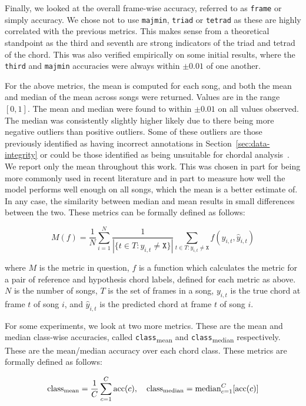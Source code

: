 Finally, we looked at the overall frame-wise accuracy, referred to as \texttt{frame} or simply accuracy. We chose not to use \texttt{majmin}, \texttt{triad} or \texttt{tetrad} as these are highly correlated with the previous metrics. This makes sense from a theoretical standpoint as the third and seventh are strong indicators of the triad and tetrad of the chord. This was also verified empirically on some initial results, where the \texttt{third} and \texttt{majmin} accuracies were always within $\pm 0.01$ of one another.

For the above metrics, the mean is computed for each song, and both the mean and median of the mean across songs were returned. Values are in the range $[0,1]$. The mean and median were found to within $\pm 0.01$ on all values observed. The median was consistently slightly higher likely due to there being more negative outliers than positive outliers. Some of these outliers are those previously identified as having incorrect annotations in Section~\ref{sec:data-integrity} or could be those identified as being unsuitable for chordal analysis~\citep{FourTimelyInsights}. We report only the mean throughout this work. This was chosen in part for being more commonly used in recent literature and in part to measure how well the model performs well enough on all songs, which the mean is a better estimate of. In any case, the similarity between median and mean results in small differences between the two. These metrics can be formally defined as follows:

\[ M(f) = \frac{1}{N} \sum_{i=1}^{N} \frac{1}{|\{t\in T : y_{i,t} \neq \texttt{X}\}|} \sum_{t\in T : y_{i,t} \neq \texttt{X}} f(y_{i,t}, \hat{y}_{i,t})\]

where $M$ is the metric in question, $f$ is a function which calculates the metric for a pair of reference and hypothesis chord labels, defined for each metric as above. $N$ is the number of songs, $T$ is the set of frames in a song, $y_{i,t}$ is the true chord at frame $t$ of song $i$, and $\hat{y}_{i,t}$ is the predicted chord at frame $t$ of song $i$.

For some experiments, we look at two more metrics. These are the mean and median class-wise accuracies, called \texttt{class}\textsubscript{mean} and \texttt{class}\textsubscript{median} respectively. These are the mean/median accuracy over each chord class. These metrics are formally defined as follows:

\[
\text{class}\textsubscript{mean} = \frac{1}{C} \sum_{c=1}^{C} \text{acc}(c), \quad
\text{class}\textsubscript{median} = \text{median}_{c=1}^{C} [\text{acc}(c)]
\]

